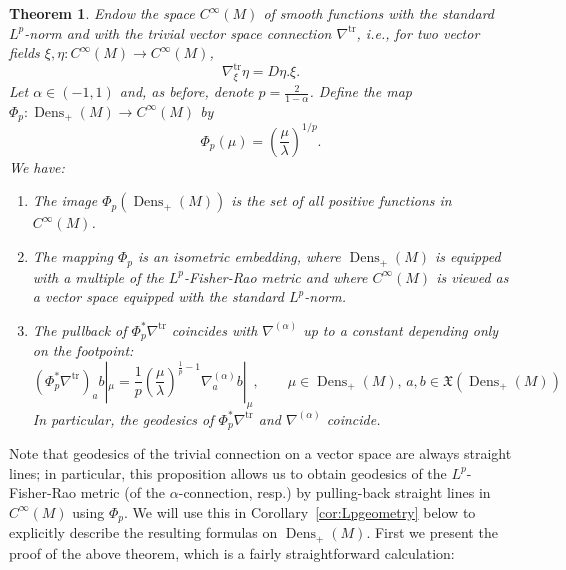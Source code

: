 \documentclass[11pt]{amsart}
\newtheorem{theorem}{Theorem}[section]
\theoremstyle{definition}
\newcommand{\dx}{\lambda}
\newcommand{\Dens}{\operatorname{Dens}_+(M)}
\newcommand{\ntr}{\nabla^{\text{tr}}}
\begin{document}
\begin{theorem}\label{thm:proot}
Endow the space $C^\infty(M)$ of smooth functions with the standard $L^p$-norm and with the trivial vector space connection $\ntr$, i.e., for two vector fields $\xi,\eta:C^\infty(M) \to C^\infty(M)$,
\[
\ntr_\xi\eta = D\eta.\xi.
\]
Let $\alpha\in (-1,1)$ and, as before, denote $p = \frac{2}{1-\alpha}$.
Define the map $\Phi_p: \Dens \to C^\infty(M)$ by
\begin{equation}\label{eq:ptransform}
\Phi_p(\mu) = \left(\frac{\mu}{\dx}\right)^{1/p}.
\end{equation}
We have:
\begin{enumerate}[label=(\alph*)]
\item The image $\Phi_p(\Dens)$  is 
the set of all positive functions in $C^{\infty}(M)$. 
\item \label{proot_FR} The mapping $\Phi_p$  
is an isometric embedding, where $\Dens$ is equipped with a multiple of the $L^p$-Fisher-Rao metric and where $C^{\infty}(M)$ is viewed as a vector space equipped with the standard $L^p$-norm.
\item \label{proot_alphaCon}The pullback of $\Phi_p^*\ntr$ coincides with $\nabla^{(\alpha)}$ up to a constant depending only on the footpoint:
\[
(\Phi_p^*\ntr)_a b|_\mu = \frac{1}{p}\left(\frac{\mu}{\dx}\right)^{\frac{1}{p}-1} \nabla^{(\alpha)}_a b|_\mu,
\qquad \mu\in \Dens, \, a,b\in \mathfrak{X}(\Dens)
\]
In particular, the geodesics of $\Phi_p^*\ntr$ and $\nabla^{(\alpha)}$ coincide.
\end{enumerate}
\end{theorem}
Note that geodesics of the trivial connection on a vector space are always straight lines; in particular, this proposition allows us to obtain geodesics of the $L^p$-Fisher-Rao metric (of the $\alpha$-connection, resp.) by pulling-back straight lines in $C^\infty(M)$ using $\Phi_p$. We will use this in Corollary~\ref{cor:Lpgeometry} below to explicitly describe the resulting formulas on $\Dens$. First we present the proof of the above theorem, which is a fairly straightforward calculation:
\end{document}
